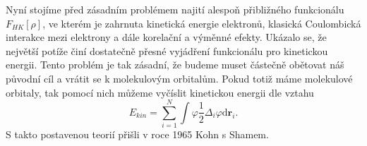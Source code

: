 Nyní stojíme před zásadním problémem najití alespoň přibližného funkcionálu $F_{HK}[\rho]$, ve kterém je zahrnuta kinetická energie elektronů, klasická Coulombická interakce mezi elektrony a dále korelační a výměnné efekty. 
Ukázalo se, že největší potíže činí dostatečně přesné vyjádření funkcionálu pro kinetickou energii.
Tento problém je tak zásadní, že budeme muset částečně obětovat náš původní cíl a vrátit se k molekulovým orbitalům.
Pokud totiž máme molekulové orbitaly, tak pomocí nich můžeme vyčíslit kinetickou energii dle vztahu
\begin{equation}
E_{kin}=\sum_{i=1}^N \int \varphi\frac{1}{2} \Delta_i \varphi \mathrm{d}\textbf{r}_i .
\end{equation}
S takto postavenou teorií přišli v roce 1965 Kohn s Shamem.

